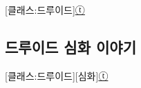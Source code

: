 \documentclass{report}
\begin{document}
	\begin{story}{}{[클래스:드루이드]\hyperlink{celesteela}{ⓣ}}
		
	\end{story}
	
	\subsection{드루이드 심화 이야기}
		\begin{story}{}{[클래스:드루이드][심화]\hyperlink{celesteela}{ⓣ}}
			
		\end{story}
\end{document}
